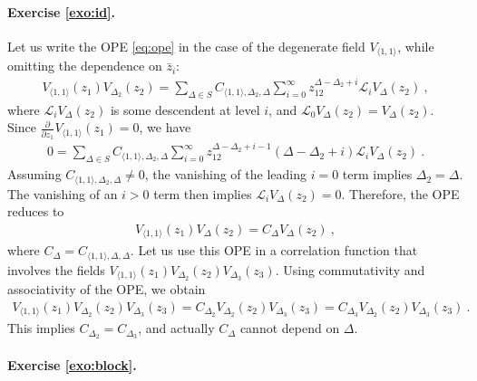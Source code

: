 \documentclass[12pt, a4paper]{article}
\theoremstyle{break}
\begin{document}
\paragraph{Exercise \ref{exo:id}.} 

Let us write the OPE \eqref{eq:ope} in the case of the degenerate field $V_{\langle 1,1\rangle}$, while omitting the dependence on $\bar z_i$:
\begin{align}
 V_{\langle 1,1\rangle}(z_1) V_{\Delta_2}(z_2) = \sum_{\Delta\in S} C_{\langle 1,1\rangle,\Delta_2,\Delta}  \sum_{i=0}^\infty z_{12}^{\Delta-\Delta_2+i} \mathcal{L}_i V_\Delta(z_2) \ ,
\end{align}
where $\mathcal{L}_i V_\Delta(z_2)$ is some descendent at level $i$, and $\mathcal{L}_0 V_\Delta(z_2) = V_\Delta(z_2)$. Since $\frac{\partial}{\partial z_1} V_{\langle 1,1\rangle}(z_1) =0 $, we have 
\begin{align}
 0 = \sum_{\Delta\in S} C_{\langle 1,1\rangle,\Delta_2,\Delta}  \sum_{i=0}^\infty z_{12}^{\Delta-\Delta_2+i-1}(\Delta-\Delta_2+i) \mathcal{L}_i V_\Delta(z_2) \ .
\end{align}
Assuming $C_{\langle 1,1\rangle,\Delta_2,\Delta}\neq 0$, the vanishing of the leading $i=0$ term implies $\Delta_2=\Delta$. The vanishing of an $i>0$ term then implies $\mathcal{L}_i V_\Delta(z_2) =0$. Therefore, the OPE reduces to 
\begin{align}
 V_{\langle 1,1\rangle}(z_1) V_{\Delta}(z_2) = C_\Delta V_\Delta(z_2)\ ,
\end{align}
where $C_\Delta = C_{\langle 1,1\rangle,\Delta,\Delta} $. Let us use this OPE in a correlation function that involves the fields $V_{\langle 1,1\rangle}(z_1)V_{\Delta_2}(z_2) V_{\Delta_3}(z_3)$. Using commutativity and associativity of the OPE, we obtain
\begin{align}
 V_{\langle 1,1\rangle}(z_1)V_{\Delta_2}(z_2) V_{\Delta_3}(z_3) = C_{\Delta_2} V_{\Delta_2}(z_2) V_{\Delta_3}(z_3) = C_{\Delta_3} V_{\Delta_2}(z_2) V_{\Delta_3}(z_3)\ .
\end{align}
This implies $C_{\Delta_2}=C_{\Delta_3}$, and actually $C_\Delta$ cannot depend on $\Delta$.

\paragraph{Exercise \ref{exo:block}.}
\end{document}
